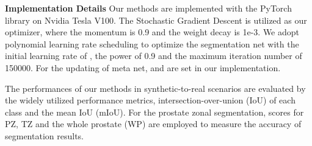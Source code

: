 \documentclass[final]{cvpr}
\begin{document}
\textbf{Implementation Details} Our methods are implemented with the PyTorch library on Nvidia Tesla V100. The Stochastic Gradient Descent is utilized as our optimizer, where the momentum is 0.9 and the weight decay is 1e-3. We adopt polynomial learning rate scheduling to optimize the segmentation net with the initial learning rate of , the power of 0.9 and the maximum iteration number of 150000. For the updating of meta net,  and  are set in our implementation. 

The performances of our methods in synthetic-to-real scenarios are evaluated by the widely utilized performance metrics, intersection-over-union (IoU) of each class and the mean IoU (mIoU). For the prostate zonal segmentation,  scores for PZ, TZ and the whole prostate (WP) are employed to measure the accuracy of segmentation results. 
\end{document}
